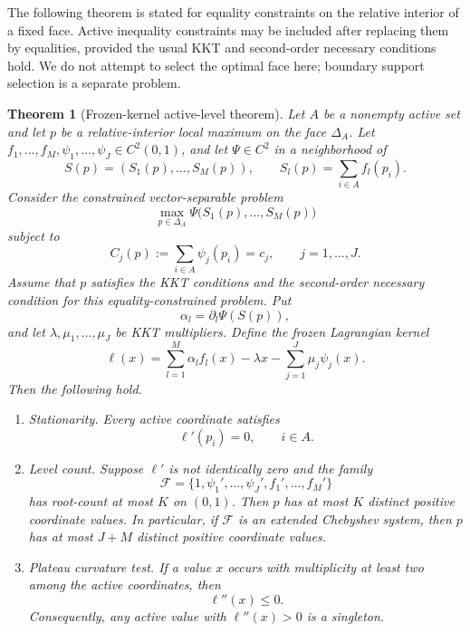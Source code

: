 \documentclass[11pt]{article}
\newtheorem{theorem}{Theorem}[section]
\theoremstyle{definition}
\begin{document}
The following theorem is stated for equality constraints on the relative interior of a fixed face.  Active inequality constraints may be included after replacing them by equalities, provided the usual KKT and second-order necessary conditions hold.  We do not attempt to select the optimal face here; boundary support selection is a separate problem.

\begin{theorem}[Frozen-kernel active-level theorem]\label{thm:frozen-kernel}
Let $A$ be a nonempty active set and let $p$ be a relative-interior local maximum on the face $\Delta_A$.  Let $f_1,\ldots,f_M,\psi_1,\ldots,\psi_J\in C^2(0,1)$, and let $\Psi\in C^2$ in a neighborhood of
\[
  S(p)=\left(S_1(p),\ldots,S_M(p)\right),
  \qquad
  S_l(p)=\sum_{i\in A} f_l(p_i).
\]
Consider the constrained vector-separable problem
\[
  \max_{p\in\Delta_A}
  \Psi\bigl(S_1(p),\ldots,S_M(p)\bigr)
\]
subject to
\[
  C_j(p):=\sum_{i\in A}\psi_j(p_i)=c_j,
  \qquad j=1,\ldots,J.
\]
Assume that $p$ satisfies the KKT conditions and the second-order necessary condition for this equality-constrained problem.  Put
\[
  \alpha_l=\partial_l\Psi(S(p)),
\]
and let $\lambda,\mu_1,\ldots,\mu_J$ be KKT multipliers.  Define the frozen Lagrangian kernel
\[
  \ell(x)=\sum_{l=1}^M \alpha_l f_l(x)-\lambda x-
       \sum_{j=1}^J \mu_j\psi_j(x).
\]
Then the following hold.

\begin{enumerate}[label=\textup{(\roman*)}]
\item \textup{Stationarity.} Every active coordinate satisfies
\[
  \ell'(p_i)=0,
  \qquad i\in A.
\]

\item \textup{Level count.} Suppose $\ell'$ is not identically zero and the family
\[
  \mathcal F=
  \{1,\psi_1',\ldots,\psi_J',f_1',\ldots,f_M'\}
\]
has root-count at most $K$ on $(0,1)$.  Then $p$ has at most $K$ distinct positive coordinate values.  In particular, if $\mathcal F$ is an extended Chebyshev system, then $p$ has at most $J+M$ distinct positive coordinate values.

\item \textup{Plateau curvature test.} If a value $x$ occurs with multiplicity at least two among the active coordinates, then
\[
  \ell''(x)\le 0.
\]
Consequently, any active value with $\ell''(x)>0$ is a singleton.
\end{enumerate}
\end{theorem}
\end{document}
